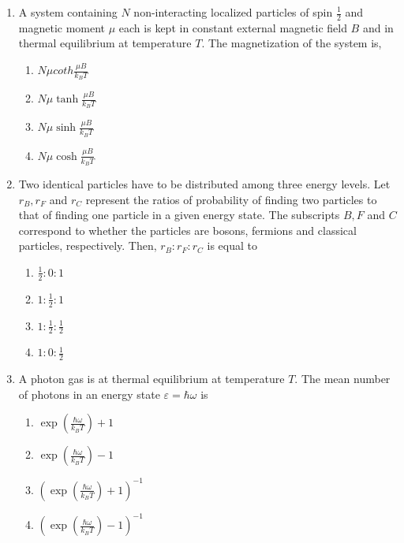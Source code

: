 \documentclass[journal]{IEEEtran}
\begin{document}
\begin{enumerate}
\begin{enumerate}
            \end{enumerate}
    \item  A system containing $N$ non-interacting localized particles of spin $\frac{1} { 2}$ and magnetic moment $\mu$ each is kept in constant external magnetic field $B$ and in thermal equilibrium at temperature $T$. The magnetization of the system is,
    \begin{multicols}{4}
            \begin{enumerate}
        \item $N \mu {coth}\frac{\mu B}{k_{B} T}$
\item $N \mu \tanh \frac{\mu B}{k_{B} T}$
\item  $N \mu \sinh \frac{\mu B}{k_{B} T}$
\item $N \mu \cosh \frac{\mu B}{k_{B} T}$
            \end{enumerate}
        \end{multicols}
    \item Two identical particles have to be distributed among three energy levels. Let $r_{B}, r_{F}$ and $r_{C}$ represent the ratios of probability of finding two particles to that of finding one particle in a given energy state. The subscripts $B, F$ and $C$ correspond to whether the particles are bosons, fermions and classical particles, respectively. Then, $r_{B}: r_{F}: r_{C}$ is equal to
    \begin{multicols}{4}
            \begin{enumerate}
              \item $\frac{1}{2}: 0: 1$
              \item  $1: \frac{1}{2}: 1$
              \item  $1: \frac{1}{2}: \frac{1}{2}$
              \item $1: 0: \frac{1}{2}$
            \end{enumerate}
        \end{multicols}
     
    \item  A photon gas is at thermal equilibrium at temperature $T$. The mean number of photons in an energy state $\varepsilon=\hbar \omega$ is
    \begin{multicols}{4}
            \begin{enumerate}
              \item  $\exp (\frac{\hbar \omega}{k_{B} T})+1$
              \item $\exp (\frac{\hbar \omega}{k_{B} T})-1$
              \item $(\exp (\frac{\hbar \omega}{k_{B} T})+1)^{-1}$
              \item  $(\exp(\frac{\hbar \omega}{k_{B} T})-1)^{-1}$
            \end{enumerate}
        \end{multicols}
    

\end{enumerate}
\end{document}

